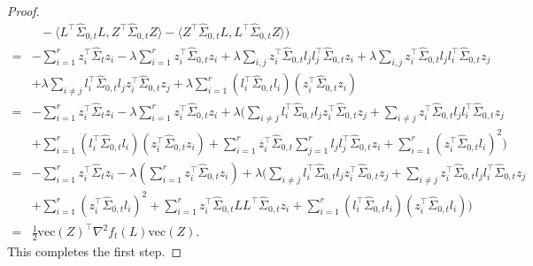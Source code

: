 \documentclass[11pt]{article}
\newcommand{\nb}[1]{\textcolor{orange}{\texttt{[#1]}}}
\newcommand{\sot}{\widehat{\Sigma}_{0,t}}
\newcommand{\0}{{\mathbf{0}}}
\newcommand{\ve}{{\mathrm{vec}}}
\begin{document}
\begin{proof}
\begin{align*}
& ~~~-\langle L^\top  \sot L,Z^\top  \sot Z\rangle-\langle Z^\top\sot L,L^\top\sot Z\rangle) \\
=&-\sum_{i=1}^rz_i^\top  \widehat{\Sigma}_tz_i-\lambda\sum_{i=1}^rz_i^\top  \sot z_i+\lambda \sum_{i,j}z_i^\top  \sot l_j l_j^\top \sot z_i+\lambda\sum_{i,j}z_i^\top\sot l_j l_i^\top\sot z_j \\
&+\lambda \sum_{i\neq j}l_i^\top  \sot l_jz_i^\top  \sot z_j+\lambda \sum_{i=1}^r (l_i^\top  \sot l_i)(z_i^\top  \sot z_i)\\
=&-\sum_{i=1}^rz_i^\top  \widehat{\Sigma}_tz_i-\lambda\sum_{i=1}^rz_i^\top  \sot z_i+\lambda(\sum_{i\neq j} l_i^\top  \sot l_jz_i^\top  \sot z_j+\sum_{i\neq j}z_i^\top\sot l_j l_i^\top\sot z_j \\
&+\sum_{i=1}^r (l_i^\top  \sot l_i)(z_i^\top  \sot z_i)+\sum_{i=1}^r z_i^\top  \sot \sum_{j=1}^r l_jl_j^\top  \sot z_i+\sum_{i=1}^r (z_i^\top  \sot l_i)^2 )\\
=&-\sum_{i=1}^rz_i^\top  \widehat{\Sigma}_tz_i-\lambda(\sum_{i=1}^rz_i^\top  \sot z_i)+\lambda(\sum_{i\neq j} l_i^\top  \sot l_jz_i^\top  \sot z_j+\sum_{i\neq j}z_i^\top \sot l_j l_i^\top \sot z_j\\
&+\sum_{i=1}^r (z_i^\top  \sot l_i)^2+\sum_{i=1}^r z_i^\top\sot LL^\top  \sot z_i+\sum_{i=1}^r (l_i^\top  \sot l_i)(z_i^\top  \sot l_i))\\
=&\frac{1}{2}\ve(Z)^\top  \nabla^2 f_t(L) \ve(Z).
\end{align*}
This completes the first step. 


\end{proof}
\end{document}
